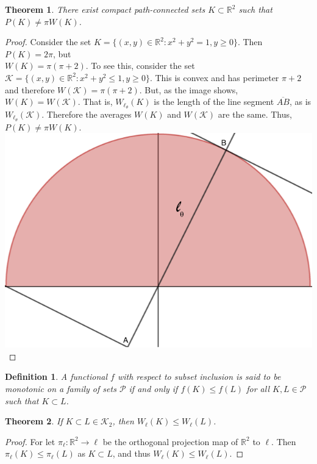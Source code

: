 \documentclass[12pt,oneside]{book}
\theoremstyle{mystyle}
\newtheorem{theorem}{Theorem}[section]
\newtheorem{definition}{Definition}[section]
\begin{document}
\begin{theorem}
There exist compact path-connected sets $K\subset \mathbb{R}^2$ such that $P(K) \ne \pi W(K)$.
\end{theorem}
\begin{proof}
Consider the set $K = \{(x,y) \in \mathbb{R}^2: x^2+y^2=1, y\geq 0\}$. Then $P(K) = 2\pi$, but \\ $W(K) = \pi(\pi+2)$. To see this, consider the set $\mathcal{K} = \{(x,y)\in \mathbb{R}^2: x^2 + y^2 \leq 1, y\geq 0\}$. This is convex and has perimeter $\pi+2$ and therefore $W(\mathcal{K}) = \pi(\pi+2)$. But, as the image shows, $W(K) = W(\mathcal{K})$. That is, $W_{\ell_{\theta}}(K)$ is the length of the line segment $\overline{AB}$, as is $W_{\ell_{\theta}}(\mathcal{K})$. Therefore the averages $W(K)$ and $W(\mathcal{K})$ are the same. Thus, $P(K) \ne \pi W(K)$.
\includegraphics[scale=0.3]{semicircle-1.png}
\end{proof}

\begin{definition}
A functional $f$ with respect to subset inclusion is said to be monotonic on a family of sets $\mathscr{P}$ if and only if $f(K)\leq f(L)$ for all $K,L \in \mathscr{P}$ such that $K\subset L$.
\end{definition}

\begin{theorem}
If $K\subset L \in \mathscr{K}_2$, then $W_{\ell}(K) \leq W_{\ell}(L)$.
\end{theorem}
\begin{proof}
For let $\pi_{\ell}:\mathbb{R}^2 \rightarrow \ell$ be the orthogonal projection map of $\mathbb{R}^2$ to $\ell$. Then $\pi_{\ell}(K)\leq \pi_{\ell}(L)$ as $K\subset L$, and thus $W_{\ell}(K)\leq W_{\ell}(L)$.
\end{proof}
\end{document}
